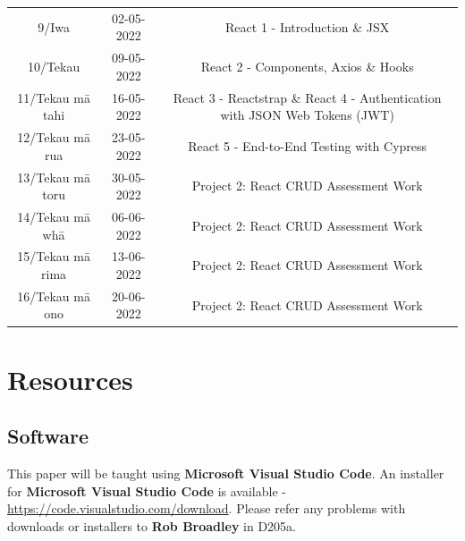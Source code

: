 \documentclass{article}
\begin{document}
\begin{tabular}{|c|c|c|c|}
	\rowcolor{yellow} \multicolumn{4}{|c|}{\footnotesize Mid Term Break}                                                                                                                         \\ \hline
	\footnotesize 9/Iwa            & \footnotesize 02-05-2022 & \multicolumn{2}{c|}{\footnotesize React 1 - Introduction \& JSX}                                                                 \\ \hline
	\footnotesize 10/Tekau         & \footnotesize 09-05-2022 & \multicolumn{2}{c|}{\footnotesize React 2 - Components, Axios \& Hooks}                                                          \\ \hline
	\footnotesize 11/Tekau mā tahi & \footnotesize 16-05-2022 & \multicolumn{2}{c|}{\footnotesize React 3 - Reactstrap \& React 4 - Authentication with JSON Web Tokens (JWT)}                                                                           \\ \hline
	\footnotesize 12/Tekau mā rua  & \footnotesize 23-05-2022 & \multicolumn{2}{c|}{\cellcolor{orange} \footnotesize React 5 - End-to-End Testing with Cypress}                                           \\ \hline
	\footnotesize 13/Tekau mā toru & \footnotesize 30-05-2022 & \multicolumn{2}{c|}{\footnotesize Project 2: React CRUD Assessment Work}                                                     \\ \hline
	\footnotesize 14/Tekau mā whā  & \footnotesize 06-06-2022 & \multicolumn{2}{c|}{\footnotesize Project 2: React CRUD Assessment Work}                                                         \\ \hline
	\footnotesize 15/Tekau mā rima & \footnotesize 13-06-2022 & \multicolumn{2}{c|}{\footnotesize Project 2: React CRUD Assessment Work}                                                         \\ \hline
	\footnotesize 16/Tekau mā ono  & \footnotesize 20-06-2022 & \multicolumn{2}{c|}{\footnotesize Project 2: React CRUD Assessment  Work}                                                        \\ \hline
\end{tabular}

\section*{Resources}

\subsection*{Software}
This paper will be taught using \textbf{Microsoft Visual Studio Code}. An installer for \textbf{Microsoft Visual Studio Code} is available - \href{https://code.visualstudio.com/download}{https://code.visualstudio.com/download}. Please refer any problems with downloads or installers to \textbf{Rob Broadley} in D205a.
\end{document}
